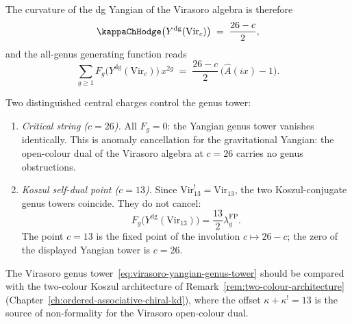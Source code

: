 The curvature of the dg Yangian of the Virasoro algebra is
therefore
\begin{equation}\label{eq:virasoro-yangian-kappa}
\kappaChHodge\bigl(Y^{\mathrm{dg}}(\mathrm{Vir}_c)\bigr)
\;=\;
\frac{26 - c}{2},
\end{equation}
and the all-genus generating function reads
\begin{equation}\label{eq:virasoro-yangian-genus-tower}
\sum_{g \ge 1}
F_g\bigl(Y^{\mathrm{dg}}(\mathrm{Vir}_c)\bigr)\,x^{2g}
\;=\;
\frac{26 - c}{2}\,\bigl(\hat{A}(ix) - 1\bigr).
\end{equation}

Two distinguished central charges control the genus tower:
\begin{enumerate}[label=\textup{(\roman*)}]
\item \emph{Critical string ($c = 26$).}\enspace
 All $F_g = 0$: the Yangian genus tower vanishes identically.
 This is anomaly cancellation for the gravitational Yangian:
 the open-colour dual of the Virasoro algebra at $c = 26$
 carries no genus obstructions.
\item \emph{Koszul self-dual point ($c = 13$).}\enspace
 Since $\mathrm{Vir}_{13}^! = \mathrm{Vir}_{13}$, the two
 Koszul-conjugate genus towers coincide. They do not cancel:
 \[
 F_g\bigl(Y^{\mathrm{dg}}(\mathrm{Vir}_{13})\bigr)
 =
 \frac{13}{2}\lambda_g^{\mathrm{FP}} .
 \]
 The point $c=13$ is the fixed point of the involution
 $c\mapsto 26-c$; the zero of the displayed Yangian tower is
 $c=26$.
\end{enumerate}

\noindent
The Virasoro genus tower~\eqref{eq:virasoro-yangian-genus-tower}
should be compared with the two-colour Koszul architecture of
Remark~\ref{rem:two-colour-architecture}
(Chapter~\ref{ch:ordered-associative-chiral-kd}), where the
offset $\kappa + \kappa^! = 13$ is the source of non-formality
for the Virasoro open-colour dual.

